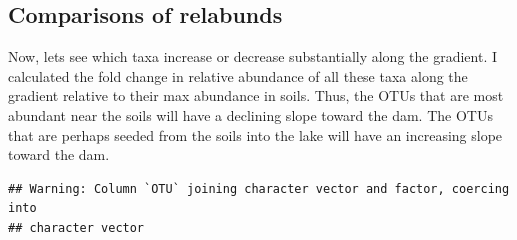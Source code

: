 \documentclass[]{article}
\newenvironment{Shaded}{\begin{snugshade}}{\end{snugshade}}
\newcommand{\KeywordTok}[1]{\textcolor[rgb]{0.13,0.29,0.53}{\textbf{#1}}}
\newcommand{\DecValTok}[1]{\textcolor[rgb]{0.00,0.00,0.81}{#1}}
\newcommand{\StringTok}[1]{\textcolor[rgb]{0.31,0.60,0.02}{#1}}
\newcommand{\OperatorTok}[1]{\textcolor[rgb]{0.81,0.36,0.00}{\textbf{#1}}}
\newcommand{\NormalTok}[1]{#1}
\begin{document}
\subsection{Comparisons of relabunds}\label{comparisons-of-relabunds}

Now, lets see which taxa increase or decrease substantially along the
gradient. I calculated the fold change in relative abundance of all
these taxa along the gradient relative to their max abundance in soils.
Thus, the OTUs that are most abundant near the soils will have a
declining slope toward the dam. The OTUs that are perhaps seeded from
the soils into the lake will have an increasing slope toward the dam.

\begin{Shaded}
\end{Shaded}

\begin{verbatim}
## Warning: Column `OTU` joining character vector and factor, coercing into
## character vector
\end{verbatim}

\begin{Shaded}
\end{Shaded}
\end{document}
